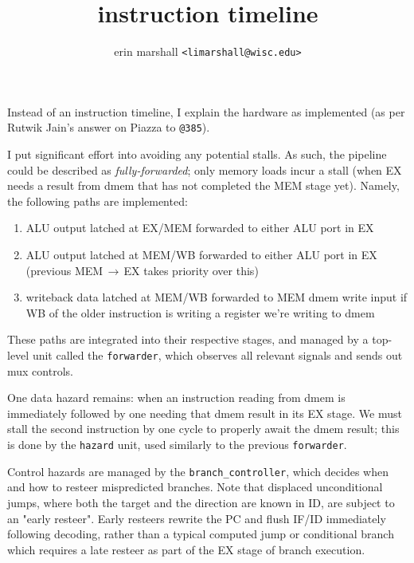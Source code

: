 \documentclass{article}
\title{instruction timeline}
\author{erin marshall \texttt{<limarshall@wisc.edu>}}
\begin{document}
\maketitle
Instead of an instruction timeline, I explain the hardware as implemented (as per Rutwik Jain's answer on Piazza to \texttt{@385}).

I put significant effort into avoiding any potential stalls. As such, the pipeline could be described as \textit{fully-forwarded};
only memory loads incur a stall (when EX needs a result from dmem that has not completed the MEM stage yet). Namely, the following paths
are implemented:

\begin{enumerate}
    \item ALU output latched at EX/MEM forwarded to either ALU port in EX
    \item ALU output latched at MEM/WB forwarded to either ALU port in EX (previous MEM\(\,\rightarrow\,\)EX takes priority over this)
    \item writeback data latched at MEM/WB forwarded to MEM dmem write input if WB of the older instruction is writing a register we're writing to dmem
\end{enumerate}

These paths are integrated into their respective stages, and managed by a top-level unit called the \texttt{forwarder}, which observes all relevant signals and sends out mux controls.

One data hazard remains: when an instruction reading from dmem is immediately followed by one needing that dmem result in its EX stage. We must stall the second instruction by one cycle
to properly await the dmem result; this is done by the \texttt{hazard} unit, used similarly to the previous \texttt{forwarder}.

Control hazards are managed by the \texttt{branch\_controller}, which decides when and how to resteer mispredicted branches. Note that displaced unconditional jumps,
where both the target and the direction are known in ID, are subject to an "early resteer". Early resteers rewrite the PC and flush IF/ID immediately following decoding,
rather than a typical computed jump or conditional branch which requires a late resteer as part of the EX stage of branch execution.
\end{document}
